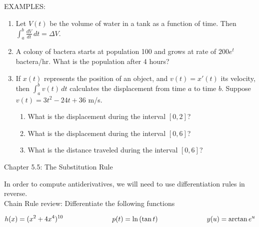 \documentclass[11pt]{article}
\begin{document}
\vspace{.5in}

EXAMPLES:\\

\begin{enumerate}
\item{Let $V(t)$ be the volume of water in a tank as a function of time.  Then $\int_a^b\frac{dV}{dt} \,dt = \Delta V$.}

\pagebreak

\item{A colony of bactera starts at population 100 and grows at rate of $200e^t$ bactera/hr.  What is the population after 4 hours?}

  \vspace{2.5in.}

  
\item{ If $x(t)$ represents the position of an object, and $v(t) = x'(t)$ its velocity, then $\int_a^bv(t)\, dt$ calculates the displacement from time $a$ to time $b$.  Suppose $v(t)=3t^2-24t+36$  m/s.
  \begin{enumerate}
  \item{What is the displacement during the interval $[0,2]$?}
    
    \vspace{1.2in.}

  \item{What is the displacement during the interval $[0,6]$?}

    \vspace{1.2in.}

  \item{What is the distance traveled during the interval $[0,6]$?}
\end{enumerate}
}
\end{enumerate}


\pagebreak
\begin{center}
\Large
\rm{Chapter 5.5:  The Substitution Rule}
\\
\end{center}
\vspace{0.2in}
In order to compute antiderivatives, we will need to use differentiation rules in reverse.\\

Chain Rule review:  Differentiate the following functions

\begin{displaymath}
h(x) = (x^2+4x^4)^{10}  \hspace{1in} p(t) = \ln{(\tan{t})}  \hspace{1.in} y(u) = \arctan{e^u} 
  \end{displaymath}
\end{document}
